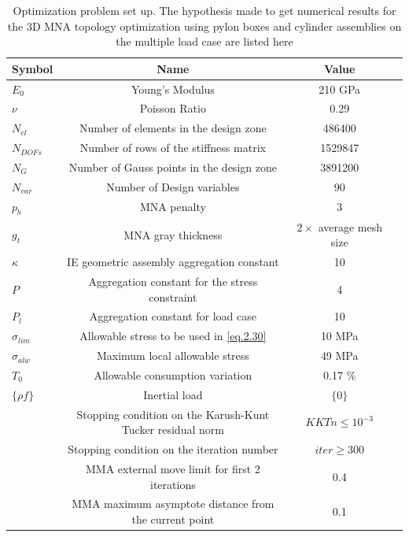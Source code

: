   
       \begin{table}[h]
                  \caption{\label{tab:table3.6} Optimization problem set up. The hypothesis made to get numerical results for the 3D MNA topology optimization using pylon boxes and cylinder assemblies on the multiple load case are listed here}
                   \centering
                   \begin{tabular}{lccc}
                   \hline
                    Symbol& Name& Value\\\hline
                   $E_0$ & Young's Modulus & 210 GPa\\
                   $\nu$ & Poisson Ratio& 0.29&\\ $N_{el}$ & Number of elements in the design zone & 486400 \\
                   $N_{DOFs}$ & Number of rows of the stiffness matrix & 1529847\\
                   $N_G$ & Number of Gauss points in the design zone & 3891200\\
                   $N_{var}$ & Number of Design variables & 90\\
          		$p_b$ & MNA penalty & 3\\
          		$g_t$ & MNA gray thickness & $2 \times$ average mesh size\\
          		$\kappa$ & IE geometric assembly aggregation constant & 10\\
          		$P$ & Aggregation constant for the stress constraint & 4\\  
          		$P_l$ & Aggregation constant for load case& 10\\ 
          		$\sigma_{lim}$ & Allowable stress to be used in \ref{eq.2.30} & 10 MPa\\
          		$\sigma_{alw}$ & Maximum local allowable stress & 49 MPa\\
          		$T_0$ & Allowable consumption variation & 0.17 \% \\
          		$\lbrace\rho f \rbrace$ & Inertial load & $\lbrace 0 \rbrace$ \\
          		 & Stopping condition on the Karush-Kunt Tucker residual norm & $KKTn\leq10^{-3}$\\ 
          		& Stopping condition on the iteration number & $iter \geq 300$ \\
          		& MMA external move limit for first 2 iterations & 0.4 \\
          		& MMA maximum asymptote distance from the current point & 0.1 \\
                   \hline
                   \end{tabular}
                   \end{table}
